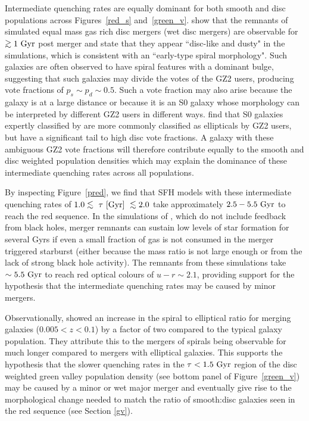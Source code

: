 Intermediate quenching rates are equally dominant for both smooth and disc populations across Figures~\ref{red_s} and~\ref{green_v}. \citet{lotz08b} show that the remnants of simulated equal mass gas rich disc mergers (wet disc mergers) are observable for $\gtrsim1~\rm{Gyr}$ post merger and state that they appear ``disc-like and dusty" in the simulations, which is consistent with an ``early-type spiral morphology".  Such galaxies are often observed to have spiral features with a dominant bulge, suggesting that such galaxies may divide the votes of the GZ2 users, producing vote fractions of $p_s \sim p_d \sim 0.5$. Such a vote fraction may also arise because the galaxy is at a large distance or because it is an S0 galaxy whose morphology can be interpreted by different GZ2 users in different ways. \citet{GZ2} find that S0 galaxies expertly classified by \citet{nair10} are more commonly classified as ellipticals by GZ2 users, but have a significant tail to high disc vote fractions. A galaxy with these ambiguous GZ2 vote fractions will therefore contribute equally to the smooth and disc weighted population densities which may explain the dominance of these intermediate quenching rates across all populations. 

By inspecting Figure~\ref{pred}, we find that SFH models with these intermediate quenching rates of $1.0 \lesssim ~\tau~\rm{[Gyr]} ~\lesssim 2.0$ take approximately $2.5-5.5~\rm{Gyr}$ to reach the red sequence. In the simulations of \citet*{springel05b}, which do not include feedback from black holes, merger remnants can sustain low levels of star formation for several Gyrs if even a small fraction of gas is not consumed in the merger triggered starburst (either because the mass ratio is not large enough or from the lack of strong black hole activity). The remnants from these simulations take $\sim5.5~\rm{Gyr}$ to reach red optical colours of $u-r \sim 2.1$, providing support for the hypothesis that the intermediate quenching rates may be caused by minor mergers. 

Observationally, \citet{Darg10a} showed an increase in the spiral to elliptical ratio for merging galaxies ($0.005 < z < 0.1$) by a factor of two compared to the typical galaxy population. They attribute this to the mergers of spirals being observable for much longer compared to mergers with elliptical galaxies. This supports the hypothesis that the slower quenching rates in the $\tau < 1.5 ~\rm{Gyr}$ region of the disc weighted green valley population density (see bottom panel of Figure~\ref{green_v}) may be caused by a minor or wet major merger and eventually give rise to the morphological change needed to match the ratio of smooth:disc galaxies seen in the red sequence (see Section \ref{gv}). 
 
